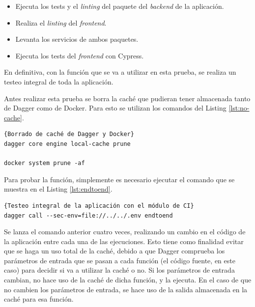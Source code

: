 \begin{itemize}
  \item Ejecuta los tests y el \textit{linting} del paquete del \textit{backend} de la aplicación.
  \item Realiza el \textit{linting} del \textit{frontend}.
  \item Levanta los servicios de ambos paquetes.
  \item Ejecuta los tests del \textit{frontend} con Cypress.
\end{itemize}

En definitiva, con la función que se va a utilizar en esta prueba, se realiza un testeo integral de toda la aplicación.

Antes realizar esta prueba se borra la caché que pudieran tener almacenada tanto de Dagger como de Docker. Para esto se utilizan los comandos del Listing \ref{lst:no-cache}.

\begin{lstlisting}[label=lst:no-cache]{Borrado de caché de Dagger y Docker}
dagger core engine local-cache prune

docker system prune -af
\end{lstlisting}

Para probar la función, simplemente es necesario ejecutar el comando que se muestra en el Listing \ref{lst:endtoend}.

\begin{lstlisting}[label=lst:endtoend]{Testeo integral de la aplicación con el módulo de CI}
dagger call --sec-env=file://../../.env endtoend
\end{lstlisting}

Se lanza el comando anterior cuatro veces, realizando un cambio en el código de la aplicación entre cada una de las ejecuciones. Esto tiene como finalidad evitar que se haga un uso total de la caché, debido a que Dagger comprueba los parámetros de entrada que se pasan a cada función (el código fuente, en este caso) para decidir si va a utilizar la caché o no. Si los parámetros de entrada cambian, no hace uso de la caché de dicha función, y la ejecuta. En el caso de que no cambien los parámetros de entrada, se hace uso de la salida almacenada en la caché para esa función.

